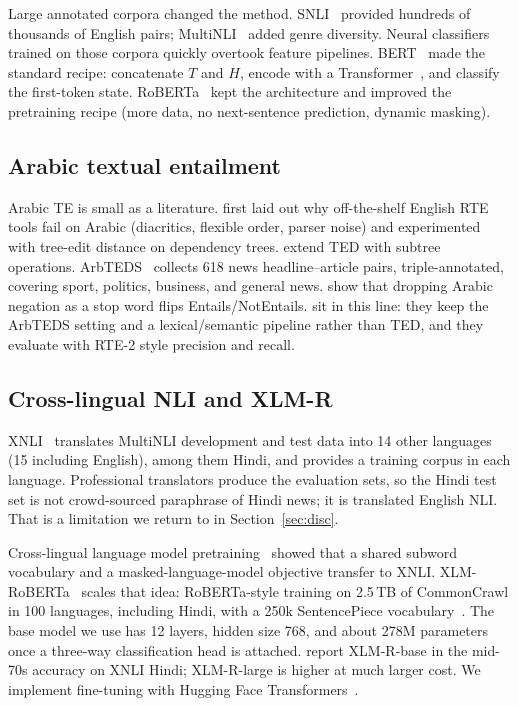 \documentclass[conference]{IEEEtran}
\begin{document}
Large annotated corpora changed the method. SNLI~\citep{bowman2015snli} provided hundreds of thousands of English pairs; MultiNLI~\citep{williams2018snli} added genre diversity. Neural classifiers trained on those corpora quickly overtook feature pipelines. BERT~\citep{devlin2019bert} made the standard recipe: concatenate $T$ and $H$, encode with a Transformer~\citep{vaswani2017attention}, and classify the first-token state. RoBERTa~\citep{liu2019roberta} kept the architecture and improved the pretraining recipe (more data, no next-sentence prediction, dynamic masking).

\subsection{Arabic textual entailment}
Arabic TE is small as a literature. \citet{alabbas2011arbte} first laid out why off-the-shelf English RTE tools fail on Arabic (diacritics, flexible order, parser noise) and experimented with tree-edit distance on dependency trees. \citet{alabbas2013jair} extend TED with subtree operations. ArbTEDS~\citep{alabbas2013dataset} collects 618 news headline--article pairs, triple-annotated, covering sport, politics, business, and general news. \citet{alkhawaldeh2015negation} show that dropping Arabic negation as a stop word flips Entails/NotEntails. \citet{khader2016textual} sit in this line: they keep the ArbTEDS setting and a lexical/semantic pipeline rather than TED, and they evaluate with RTE-2 style precision and recall.

\subsection{Cross-lingual NLI and XLM-R}
XNLI~\citep{conneau2018xnli} translates MultiNLI development and test data into 14 other languages (15 including English), among them Hindi, and provides a training corpus in each language. Professional translators produce the evaluation sets, so the Hindi test set is not crowd-sourced paraphrase of Hindi news; it is translated English NLI. That is a limitation we return to in Section~\ref{sec:disc}.

Cross-lingual language model pretraining~\citep{lample2019xlm} showed that a shared subword vocabulary and a masked-language-model objective transfer to XNLI. XLM-RoBERTa~\citep{conneau2020xlmr} scales that idea: RoBERTa-style training on 2.5\,TB of CommonCrawl in 100 languages, including Hindi, with a 250k SentencePiece vocabulary~\citep{kudo2018sentencepiece}. The base model we use has 12 layers, hidden size 768, and about 278M parameters once a three-way classification head is attached. \citet{conneau2020xlmr} report XLM-R-base in the mid-70s accuracy on XNLI Hindi; XLM-R-large is higher at much larger cost. We implement fine-tuning with Hugging Face Transformers~\citep{wolf2020transformers}.
\end{document}
